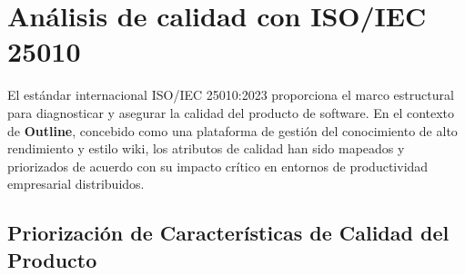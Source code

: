 \documentclass[12pt]{article}
\begin{document}
\section{Análisis de calidad con ISO/IEC 25010}

El estándar internacional ISO/IEC 25010:2023 proporciona el marco estructural para diagnosticar y asegurar la calidad del producto de software. En el contexto de \textbf{Outline}, concebido como una plataforma de gestión del conocimiento de alto rendimiento y estilo wiki, los atributos de calidad han sido mapeados y priorizados de acuerdo con su impacto crítico en entornos de productividad empresarial distribuidos.

\subsection{Priorización de Características de Calidad del Producto}
\end{document}

